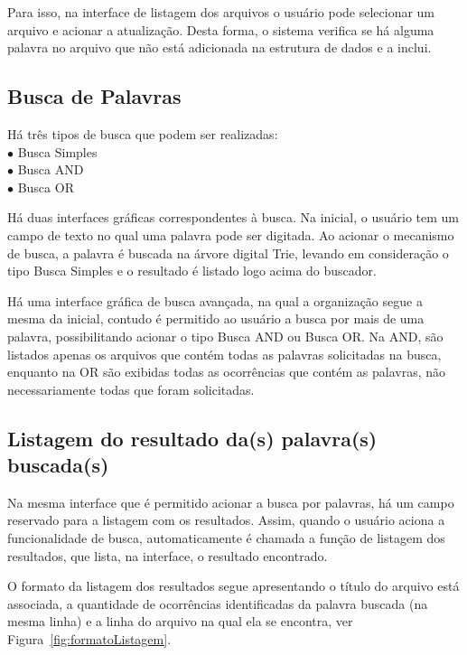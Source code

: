 \documentclass[12pt]{article}
\begin{document}
	Para isso, na interface de listagem dos arquivos o usuário pode selecionar um arquivo e acionar a atualização. Desta forma, o sistema verifica se há alguma palavra no arquivo que não está adicionada na estrutura de dados e a inclui.

\subsection{Busca de Palavras}
Há três tipos de busca que podem ser realizadas: \\
$\bullet$ Busca Simples\\
$\bullet$ Busca AND\\
$\bullet$ Busca OR

Há duas interfaces gráficas correspondentes à busca. Na inicial, o usuário tem um campo de texto no qual uma palavra pode ser digitada. Ao acionar o mecanismo de busca, a palavra é buscada na árvore digital Trie, levando em consideração o tipo Busca Simples e o resultado é listado logo acima do buscador.

	Há uma interface gráfica de busca avançada, na qual a organização segue a mesma da inicial, contudo é permitido ao usuário a busca por mais de uma palavra, possibilitando acionar o tipo Busca AND ou Busca OR. Na AND, são listados apenas os arquivos que contém todas as palavras solicitadas na busca, enquanto na OR são exibidas todas as ocorrências que contém as palavras, não necessariamente todas que foram solicitadas.

\subsection{Listagem do resultado da(s) palavra(s) buscada(s)}
Na mesma interface que é permitido acionar a busca por palavras, há um campo reservado para a listagem com os resultados. Assim, quando o usuário aciona a funcionalidade de busca, automaticamente é chamada a função de listagem dos resultados, que lista, na interface, o resultado encontrado.

	O formato da listagem dos resultados segue apresentando o título do arquivo está associada, a quantidade de ocorrências identificadas da palavra buscada (na mesma linha) e a linha do arquivo na qual ela se encontra, ver Figura~\ref{fig:formatoListagem}.
\end{document}
